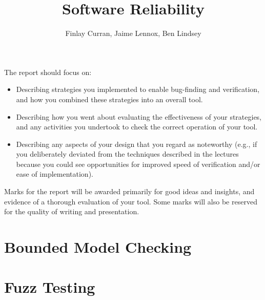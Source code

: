 \documentclass[11pt]{article}
\title{Software Reliability}
\author{Finlay Curran, Jaime Lennox, Ben Lindsey}
\begin{document}
\maketitle

The report should focus on:
\begin{itemize}
\item  Describing strategies you implemented to enable bug-finding and verification, and how you combined
these strategies into an overall tool.
\item Describing how you went about evaluating the effectiveness of your strategies, and any activities you
undertook to check the correct operation of your tool.
\item Describing any aspects of your design that you regard as noteworthy (e.g., if you deliberately deviated
from the techniques described in the lectures because you could see opportunities for improved speed of
verification and/or ease of implementation).
\end{itemize}
Marks for the report will be awarded primarily for good ideas and insights, and evidence of a thorough
evaluation of your tool. Some marks will also be reserved for the quality of writing and presentation.

\section*{Bounded Model Checking}


\section*{Fuzz Testing}
\end{document}

